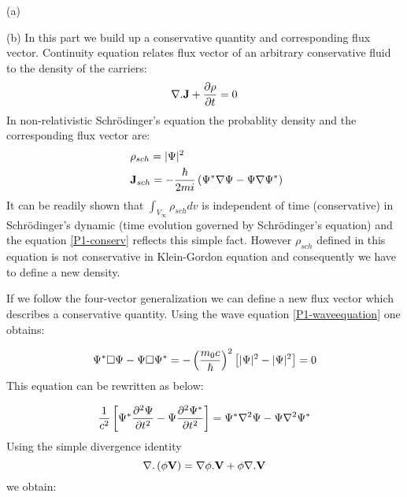 \begin{homeworkProblem}
\begin{homeworkSection}{(a)}
\end{homeworkSection}
\begin{homeworkSection}{(b)}
In this part we build up a conservative quantity and corresponding flux vector. Continuity equation relates flux vector of an arbitrary conservative fluid to the density of the carriers:
\begin{equation}\label{P1-flux}
\nabla.\mathbf{J}+\frac{\partial \rho}{\partial t}=0
\end{equation} 
In non-relativistic Schr\"odinger's equation the probablity density and the corresponding flux vector are:
\begin{align}
&\rho_{sch}=\lvert\Psi\rvert^2\\\
&\mathbf{J}_{sch}=-\frac{\hbar}{2mi}\left(\Psi^*\nabla\Psi-\Psi\nabla\Psi^*\right)\label{P1-conserv}
\end{align}
It can be readily shown that $\int_{V_{\infty}}\rho_{sch}dv$ is independent of time (conservative) in  Schr\"odinger's dynamic (time evolution governed by Schr\"odinger's equation) and the equation \eqref{P1-conserv} reflects this simple fact. However $\rho_{sch}$ defined in this equation is not conservative in Klein-Gordon equation and consequently we have to define a new density. 

If we follow the four-vector generalization we can define a new flux vector which describes a conservative quantity. Using the wave equation \eqref{P1-waveequation} one obtains:

\begin{equation}
\Psi^*\Box\Psi-\Psi\Box\Psi^*=-\left(\frac{m_0c}{\hbar}\right)^2\left[\lvert\Psi\rvert^2-\lvert\Psi\rvert^2\right]=0
\end{equation}
This equation can be rewritten as below:

\begin{equation}
\frac{1}{c^2}\left[\Psi^*\dfrac{\partial^2 {\Psi}}{\partial {t}^2}-\Psi\dfrac{\partial^2 {\Psi^*}}{\partial {t}^2}\right]=\Psi^*\nabla^2\Psi-\Psi\nabla^2\Psi^*
\end{equation}
Using the simple divergence identity $$\nabla.\left(\phi\mathbf{V}\right)=\nabla\phi.\mathbf{V}+\phi\nabla.\mathbf{V}$$
we obtain:


\end{homeworkSection}
\end{homeworkProblem}
